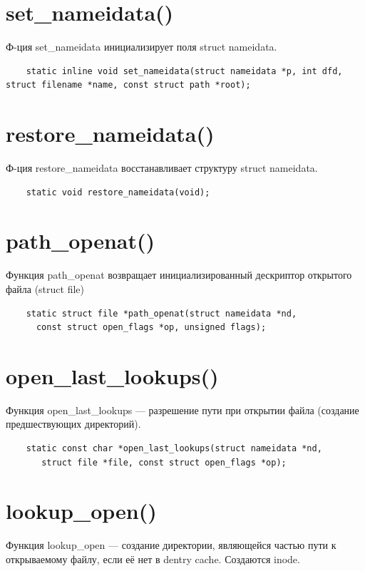 \section{set\_nameidata()}
Ф-ция set\_nameidata инициализирует поля struct nameidata.

\begin{lstlisting}
	static inline void set_nameidata(struct nameidata *p, int dfd, struct filename *name, const struct path *root);
\end{lstlisting}

\section{restore\_nameidata()}
Ф-ция restore\_nameidata восстанавливает структуру struct nameidata.

\begin{lstlisting}
	static void restore_nameidata(void);
\end{lstlisting}

\section{path\_openat()}
Функция path\_openat возвращает инициализированный дескриптор открытого файла (struct file)

\begin{lstlisting}
    static struct file *path_openat(struct nameidata *nd,
      const struct open_flags *op, unsigned flags);
\end{lstlisting}

\section{open\_last\_lookups()}
Функция open\_last\_lookups --- разрешение пути при открытии файла (создание предшествующих директорий).

\begin{lstlisting}
    static const char *open_last_lookups(struct nameidata *nd,
       struct file *file, const struct open_flags *op);
\end{lstlisting}

\section{lookup\_open()}
Функция lookup\_open --- создание директории, являющейся частью пути к открываемому файлу, если её нет в dentry cache. Создаются inode.

